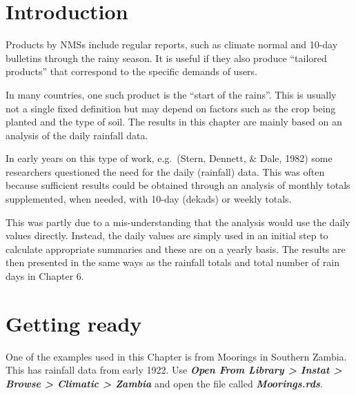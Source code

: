 \documentclass[
  letterpaper,
  DIV=11,
  numbers=noendperiod]{scrreprt}
\begin{document}
\section{Introduction}\label{introduction-5}

Products by NMSs include regular reports, such as climate normal and
10-day bulletins through the rainy season. It is useful if they also
produce ``tailored products'' that correspond to the specific demands of
users.

In many countries, one such product is the ``start of the rains''. This
is usually not a single fixed definition but may depend on factors such
as the crop being planted and the type of soil. The results in this
chapter are mainly based on an analysis of the daily rainfall data.

In early years on this type of work, e.g.~(Stern, Dennett, \& Dale,
1982) some researchers questioned the need for the daily (rainfall)
data. This was often because sufficient results could be obtained
through an analysis of monthly totals supplemented, when needed, with
10-day (dekads) or weekly totals.

This was partly due to a mis-understanding that the analysis would use
the daily values directly. Instead, the daily values are simply used in
an initial step to calculate appropriate summaries and these are on a
yearly basis. The results are then presented in the same ways as the
rainfall totals and total number of rain days in Chapter 6.

\section{Getting ready}\label{getting-ready}

One of the examples used in this Chapter is from Moorings in Southern
Zambia. This has rainfall data from early 1922. Use \textbf{\emph{Open
From Library \textgreater{} Instat \textgreater{} Browse \textgreater{}
Climatic \textgreater{} Zambia}} and open the file called
\textbf{\emph{Moorings.rds}}.
\end{document}
